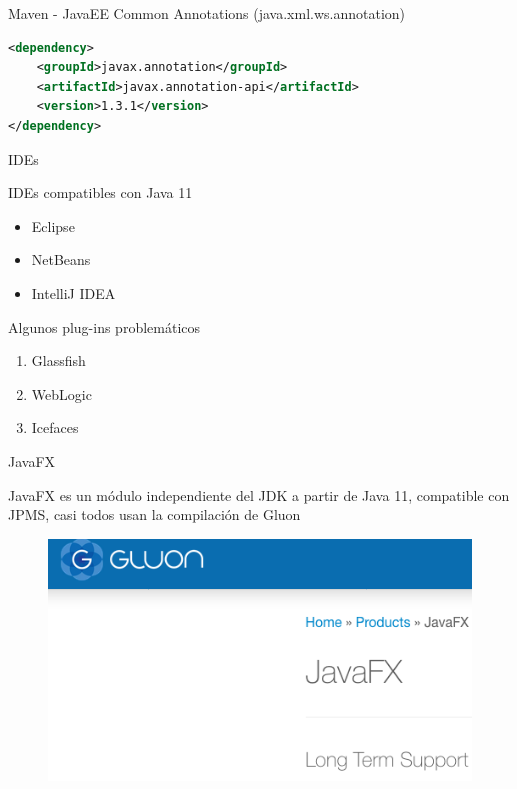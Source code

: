 \documentclass[aspectratio=169]{beamer}
\begin{document}
\begin{frame}[fragile]{Maven - JavaEE}
Common Annotations (java.xml.ws.annotation)

\begin{lstlisting}[language=xml]
<dependency>
    <groupId>javax.annotation</groupId>
    <artifactId>javax.annotation-api</artifactId>
    <version>1.3.1</version>
</dependency>
\end{lstlisting}
\end{frame}

\begin{frame}[fragile]{IDEs}
    
    IDEs compatibles con Java 11
    \begin{itemize}
        \item Eclipse
        \item NetBeans
        \item IntelliJ IDEA
    \end{itemize}
    
    Algunos plug-ins problemáticos
    \begin{enumerate}
        \item Glassfish
        \item WebLogic
        \item Icefaces
    \end{enumerate}
\end{frame}

\begin{frame}[fragile]{JavaFX}
    
    JavaFX es un módulo independiente del JDK a partir de Java 11, compatible con JPMS, casi todos usan la compilación de Gluon
    \begin{figure}
        \centering
        \includegraphics[width=\linewidth]{Images/gluon}
    \end{figure}
\end{frame}
\end{document}
